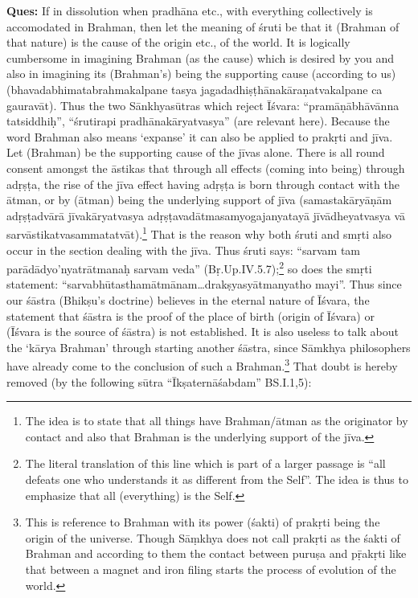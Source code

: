 \vskip 6pt

\textbf{Ques:} If in dissolution when pradhāna etc., with everything collectively is accomodated in Brahman, then let the meaning of śruti be that it (Brahman of that nature) is the cause of the origin etc., of the world. It is logically cumbersome in imagining Brahman (as the cause) which is desired by you and also in imagining its (Brahman’s) being the supporting cause (according to us) (bhavadabhimatabrahmakalpane tasya jagadadhiṣṭhānakāraṇatvakalpane ca gauravāt). Thus the two Sānkhyasūtras which reject Īśvara: “pramāṇābhāvānna tatsiddhiḥ”, “śrutirapi pradhānakāryatvasya” (are relevant here). Because the word Brahman also means ‘expanse’ it can also be applied to prakṛti and jīva. Let (Brahman) be the supporting cause of the jīvas alone. There is all round consent amongst the āstikas that through all effects (coming into being) through adṛṣṭa, the rise of the jīva effect  having adṛṣṭa is born through contact with the ātman,  or by (ātman) being the underlying support of jīva  (samastakāryāṇām adṛṣṭadvārā jīvakāryatvasya adṛṣṭavadātmasamyogajanyatayā jīvādheyatvasya vā sarvāstikatvasa\-mmatatvāt).\footnote{The idea is to state that all things have Brahman/ātman as the originator by contact and also that Brahman is the underlying support of the jīva.} That is the reason why both śruti and smṛti also occur in the section dealing with the jīva. Thus śruti says: “sarvam tam parādādyo’nyatrātmanaḥ sarvam veda” (Bṛ.Up.IV.5.7);\footnote{The literal translation of this line which is part of a larger passage is “all defeats one who understands it as different from the Self”. The idea is thus to emphasize that all (everything) is the Self.} so does the smṛti statement: “sarvabhūtasthamātmānam…drakṣyasyātmanyatho mayi”. Thus since our śāstra (Bhikṣu’s doctrine) believes in the eternal nature of Īśvara, the statement that śāstra is the proof of the place of birth (origin of Īśvara) or (Īśvara is the source of śāstra) is not established. It is also useless to talk about the ‘kārya Brahman’ through starting another śāstra, since Sāmkhya philosophers have already come to the conclusion of such a Brahman.\footnote{This is reference to Brahman with its power (śakti) of prakṛti being the origin of the universe. Though Sāṃkhya does not call prakṛti as the śakti of Brahman and according to them the contact between puruṣa and pṝakṛti like that between a magnet and iron filing starts the process of evolution of the world.} That doubt is hereby removed (by the following sūtra “Īkṣaternāśabdam” BS.I.1,5):

